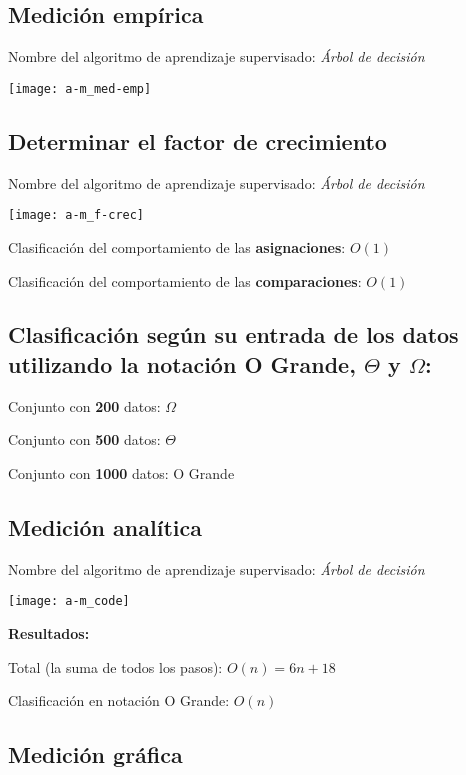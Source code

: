 \documentclass{article}
\begin{document}
\subsection{Medición empírica}
Nombre del algoritmo de aprendizaje supervisado: \textit{Árbol de decisión}

\begin{center}
  \texttt{[image: a-m\_med-emp]}
\end{center}

\subsection{Determinar el factor de crecimiento}
Nombre del algoritmo de aprendizaje supervisado: \textit{Árbol de decisión}

\begin{center}
  \texttt{[image: a-m\_f-crec]}
\end{center}

Clasificación del comportamiento de las \textbf{asignaciones}: \(O(1)\)

Clasificación del comportamiento de las \textbf{comparaciones}: \(O(1)\)

\subsection{Clasificación según su entrada de los datos utilizando la notación O Grande, \(\Theta\) y \(\Omega\):}

Conjunto con \textbf{200} datos:  \(\Omega\)

Conjunto con \textbf{500} datos: \(\Theta\)

Conjunto con \textbf{1000} datos:  O Grande

\subsection{Medición analítica}
Nombre del algoritmo de aprendizaje supervisado: \textit{Árbol de decisión}

\begin{center}
  \texttt{[image: a-m\_code]}
\end{center}

\textbf{Resultados:}

Total (la suma de todos los pasos): \(O(n) = 6n+18\)

Clasificación en notación O Grande: \(O(n)\)

\subsection{Medición gráfica}
\end{document}

